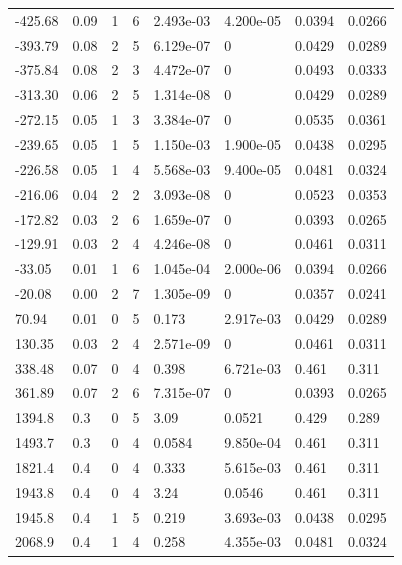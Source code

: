 \documentclass[preview]{standalone}
\begin{document}
{{\begin{tabular}{L{1.2cm}C{1.2cm} C{0.3cm}C{0.5cm} C{1.4cm}C{1.4cm} C{1.4cm}C{1.4cm}}
  -425.68  &  0.09  & 1     &  6 &  2.493e-03  & 4.200e-05  & 0.0394 &  0.0266   \\ 
  -393.79  &  0.08  & 2     &  5 &  6.129e-07  & 0  & 0.0429 &  0.0289   \\ 
  -375.84  &  0.08  & 2     &  3 &  4.472e-07  & 0  & 0.0493 &  0.0333   \\ 
  -313.30  &  0.06  & 2     &  5 &  1.314e-08  & 0  & 0.0429 &  0.0289   \\ 
  -272.15  &  0.05  & 1     &  3 &  3.384e-07  & 0  & 0.0535 &  0.0361   \\ 
  -239.65  &  0.05  & 1     &  5 &  1.150e-03  & 1.900e-05  & 0.0438 &  0.0295   \\ 
  -226.58  &  0.05  & 1     &  4 &  5.568e-03  & 9.400e-05  & 0.0481 &  0.0324   \\ 
  -216.06  &  0.04  & 2     &  2 &  3.093e-08  & 0  & 0.0523 &  0.0353   \\ 
  -172.82  &  0.03  & 2     &  6 &  1.659e-07  & 0  & 0.0393 &  0.0265   \\ 
  -129.91  &  0.03  & 2     &  4 &  4.246e-08  & 0  & 0.0461 &  0.0311   \\ 
  -33.05  &  0.01  & 1     &  6 &  1.045e-04  & 2.000e-06  & 0.0394 &  0.0266   \\ 
  -20.08  &  0.00  & 2     &  7 &  1.305e-09  & 0  & 0.0357 &  0.0241   \\ 
  70.94  &  0.01  & 0     &  5 &  0.173  & 2.917e-03  & 0.0429 &  0.0289   \\ 
  130.35  &  0.03  & 2     &  4 &  2.571e-09  & 0  & 0.0461 &  0.0311   \\ 
  338.48  &  0.07  & 0     &  4 &  0.398  & 6.721e-03  & 0.461 &  0.311   \\ 
  361.89  &  0.07  & 2     &  6 &  7.315e-07  & 0  & 0.0393 &  0.0265   \\ 
  1394.8  &   0.3  & 0     &  5 &  3.09  & 0.0521  & 0.429 &  0.289   \\ 
  1493.7  &   0.3  & 0     &  4 &  0.0584  & 9.850e-04  & 0.461 &  0.311   \\ 
  1821.4  &   0.4  & 0     &  4 &  0.333  & 5.615e-03  & 0.461 &  0.311   \\ 
  1943.8  &   0.4  & 0     &  4 &  3.24  & 0.0546  & 0.461 &  0.311   \\ 
  1945.8  &   0.4  & 1     &  5 &  0.219  & 3.693e-03  & 0.0438 &  0.0295   \\ 
  2068.9  &   0.4  & 1     &  4 &  0.258  & 4.355e-03  & 0.0481 &  0.0324   \\ 

\end{tabular}}}
\end{document}
